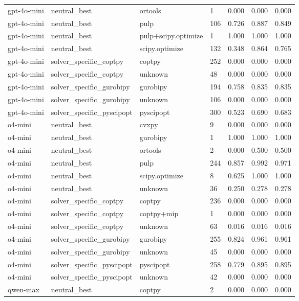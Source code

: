 \begin{table}[t]
\begin{tabular}{lllllll}
gpt-4o-mini & neutral\_best & ortools & 1 & 0.000 & 0.000 & 0.000 \\
gpt-4o-mini & neutral\_best & pulp & 106 & 0.726 & 0.887 & 0.849 \\
gpt-4o-mini & neutral\_best & pulp+scipy.optimize & 1 & 1.000 & 1.000 & 1.000 \\
gpt-4o-mini & neutral\_best & scipy.optimize & 132 & 0.348 & 0.864 & 0.765 \\
gpt-4o-mini & solver\_specific\_coptpy & coptpy & 252 & 0.000 & 0.000 & 0.000 \\
gpt-4o-mini & solver\_specific\_coptpy & unknown & 48 & 0.000 & 0.000 & 0.000 \\
gpt-4o-mini & solver\_specific\_gurobipy & gurobipy & 194 & 0.758 & 0.835 & 0.835 \\
gpt-4o-mini & solver\_specific\_gurobipy & unknown & 106 & 0.000 & 0.000 & 0.000 \\
gpt-4o-mini & solver\_specific\_pyscipopt & pyscipopt & 300 & 0.523 & 0.690 & 0.683 \\
o4-mini & neutral\_best & cvxpy & 9 & 0.000 & 0.000 & 0.000 \\
o4-mini & neutral\_best & gurobipy & 1 & 1.000 & 1.000 & 1.000 \\
o4-mini & neutral\_best & ortools & 2 & 0.000 & 0.500 & 0.500 \\
o4-mini & neutral\_best & pulp & 244 & 0.857 & 0.992 & 0.971 \\
o4-mini & neutral\_best & scipy.optimize & 8 & 0.625 & 1.000 & 1.000 \\
o4-mini & neutral\_best & unknown & 36 & 0.250 & 0.278 & 0.278 \\
o4-mini & solver\_specific\_coptpy & coptpy & 236 & 0.000 & 0.000 & 0.000 \\
o4-mini & solver\_specific\_coptpy & coptpy+mip & 1 & 0.000 & 0.000 & 0.000 \\
o4-mini & solver\_specific\_coptpy & unknown & 63 & 0.016 & 0.016 & 0.016 \\
o4-mini & solver\_specific\_gurobipy & gurobipy & 255 & 0.824 & 0.961 & 0.961 \\
o4-mini & solver\_specific\_gurobipy & unknown & 45 & 0.000 & 0.000 & 0.000 \\
o4-mini & solver\_specific\_pyscipopt & pyscipopt & 258 & 0.779 & 0.895 & 0.895 \\
o4-mini & solver\_specific\_pyscipopt & unknown & 42 & 0.000 & 0.000 & 0.000 \\
qwen-max & neutral\_best & coptpy & 2 & 0.000 & 0.000 & 0.000 \\

\end{tabular}
\end{table}
